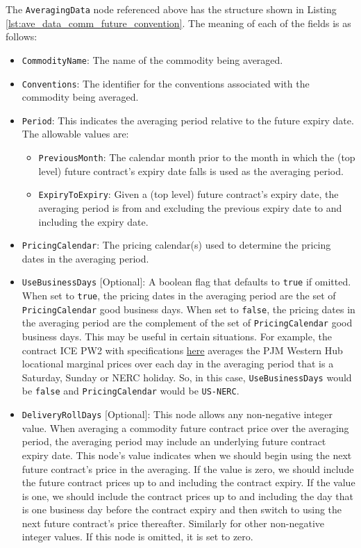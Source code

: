 The \lstinline!AveragingData! node referenced above has the structure shown in Listing \ref{lst:ave_data_comm_future_convention}. The meaning of each of the fields is as follows:

\begin{itemize}
\item \lstinline!CommodityName!: The name of the commodity being averaged.
\item \lstinline!Conventions!: The identifier for the conventions associated with the commodity being averaged.
\item \lstinline!Period!: This indicates the averaging period relative to the future expiry date. The allowable values are:
    \begin{itemize}
    \item \lstinline!PreviousMonth!: The calendar month prior to the month in which the (top level) future contract's expiry date falls is used as the averaging period.
    \item \lstinline!ExpiryToExpiry!: Given a (top level) future contract's expiry date, the averaging period is from and excluding the previous expiry date to and including the expiry date.
    \end{itemize}
\item \lstinline!PricingCalendar!: The pricing calendar(s) used to determine the pricing dates in the averaging period.
\item \lstinline!UseBusinessDays! [Optional]: A boolean flag that defaults to \lstinline!true! if omitted. When set to \lstinline!true!, the pricing dates in the averaging period are the set of \lstinline!PricingCalendar! good business days. When set to \lstinline!false!, the pricing dates in the averaging period are the complement of the set of \lstinline!PricingCalendar! good business days. This may be useful in certain situations. For example, the contract ICE PW2 with specifications \href{https://www.theice.com/products/71090520/PJM-Western-Hub-Real-Time-Peak-2x16-Fixed-Price-Future}{here} averages the PJM Western Hub locational marginal prices over each day in the averaging period that is a Saturday, Sunday or NERC holiday. So, in this case, \lstinline!UseBusinessDays! would be \lstinline!false! and \lstinline!PricingCalendar! would be \lstinline!US-NERC!.
\item \lstinline!DeliveryRollDays! [Optional]: This node allows any non-negative integer value. When averaging a commodity future contract price over the averaging period, the averaging period may include an underlying future contract expiry date. This node's value indicates when we should begin using the next future contract's price in the averaging. If the value is zero, we should include the future contract prices up to and including the contract expiry. If the value is one, we should include the contract prices up to and including the day that is one business day before the contract expiry and then switch to using the next future contract's price thereafter. Similarly for other non-negative integer values. If this node is omitted, it is set to zero.

\end{itemize}
